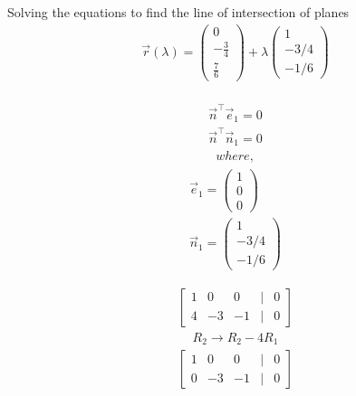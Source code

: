 \documentclass{beamer}
\begin{document}
\begin{frame}
Solving the equations to find the line of intersection of planes\\
\begin{align}
\vec{r}(\lambda) = \begin{pmatrix}0 \\-\frac{3}{4} \\\frac{7}{6}\end{pmatrix} + \lambda \begin{pmatrix}1 \\-3/4 \\-1/6\end{pmatrix}
\end{align}\\
\begin{align}
\vec{n}^\top \vec{e}_1 = 0\\
\vec{n}^\top \vec{n}_1 = 0
\end{align}
\begin{align}
where,
\end{align}
\begin{align}
\vec{e}_1 = \begin{pmatrix} 1 \\ 0 \\ 0 \end{pmatrix}\\ \vec{n}_1 = \begin{pmatrix} 1 \\ -3/4 \\ -1/6 \end{pmatrix}
\end{align}
\end{frame}
\begin{frame}
\begin{align}
\begin{bmatrix}1 & 0 & 0 & | & 0 \\4 & -3 & -1 & | & 0\end{bmatrix}
\end{align}
\begin{align}
R_2 \rightarrow R_2 - 4R_1
\end{align}
\begin{align}
\begin{bmatrix}1 & 0 & 0 & | & 0 \\0 & -3 & -1 & | & 0\end{bmatrix}
\end{align}
\end{frame}
\end{document}
